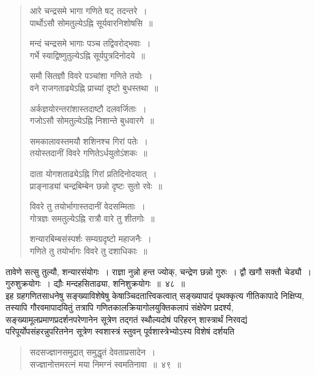 \documentclass[11pt, openany]{book}
\begin{document}
\begin{quote}
{\qt आरे चन्द्रसमे भागा गणिते षट् तदन्तरे~।\\
पार्थोऽसौ सोमतुल्येऽह्नि सूर्यवारनिशोषसि~॥
	
मन्दं चन्द्रसमे भागाः पञ्च तद्विवरोद्भवाः~।\\
गर्भे स्याद्विष्णुतुल्येऽह्नि सूर्यपुत्रदिनोदये~॥

समौ सितज्ञौ विवरे पञ्चांशा गणिते तयोः~।\\
वने राजगताढ्येऽह्नि प्राच्यां दृष्टो बुधस्तथा~॥

अर्कज्ञयोरन्तरांशास्तदाष्टौ दलवर्जिताः~।\\
गजोऽसौ सोमतुल्येऽह्नि निशान्ते बुधवारगे~॥

समकालावस्तमयौ शशिनश्च गिरां पतेः~।\\
तयोस्तदानीं विवरे गणितेऽर्धयुतोऽंशकः~॥

दाता योगशताढ्येऽह्नि गिरां प्रतिदिनोदयात्~।\\
प्राङ्नाड्यां चन्द्रबिम्बेन छन्नो दृष्टः सुतो रवेः~॥

विवरे तु तयोर्भागास्तदानीं वेदसम्मिताः~।\\
गोत्रज्ञः समतुल्येऽह्नि रात्रौ वारे तु शीतगोः~॥

शन्यारबिम्बसंस्पर्शः सम्यग्रदृष्टो महाजनैः~।\\
गणिते तु तयोर्भागः विवरे तु दशाधिकाः~॥} 
\end{quote}

\noindent तावेणे सत्सु तुल्यौ, शन्यारसंयोगः~। राज्ञा नुन्नो हन्त ज्योक्, चन्द्रेण छन्नो गुरुः~। द्वौ खगौ सक्तौ चेड्यौ~। गुरुशुक्रयोगः~। द्यौः मन्दहसिताढ्या, शनिशुक्रयोगः~॥~४८~॥ \\

\indent इह ग्रहगणितसाधनेषु सङ्ख्याविशेषेषु केषाञ्चिदतात्त्विकत्वात् सङ्ख्यापादं पृथक्कृत्य गीतिकापादे निक्षिप्य, तस्यापि गौरवमापादयितुं तत्रापि गणितकालक्रियागोलयुक्तिकलापं संक्षेपेण प्रदर्श्य, सङ्ख्यामूलप्रमाणप्रदर्शनपरेणानेन सूत्रेण तद्गतं स्थौल्यदोषं परिहरन् शास्त्रार्थं निरवद्यं
परिपूर्योपसंहरन्नुपरितनेन सूत्रेण स्वशास्त्रं स्तुवन् पूर्वशास्त्रेभ्योऽस्य विशेषं दर्शयति\textendash 

\newpage
\begin{quote}
{\ab सदसज्ज्ञानसमुद्रात् समुद्धृतं देवताप्रसादेन~।\\
सज्ज्ञानोत्तमरत्नं मया निमग्नं स्वमतिनावा~॥~४९~॥}
\end{quote}
\end{document}
